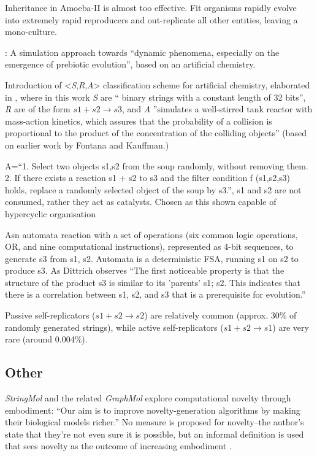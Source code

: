 Inheritance in Amoeba-II is almost too effective. Fit organisms rapidly evolve into extremely rapid reproducers and out-replicate all other entities, leaving a mono-culture.

\begin{NOTES}
\cite{Dittrich1998}:
A simulation approach towards ``dynamic phenomena, especially on the emergence of prebiotic evolution'', based on an artificial chemistry.

Introduction of \textless{}\emph{S},\emph{R},\emph{A}\textgreater{} classification scheme for artificial chemistry, elaborated in \parencite{Dittrich:2001zr}, where in this work \emph{S} are `` binary strings with a constant length of 32 bits'', \emph{R} are of the form $s1+s2 \rightarrow s3$, and \emph{A} ''simulates a well-stirred tank reactor with mass-action kinetics, which assures that the probability of a collision is proportional to the product of the concentration of the colliding objects'' (based on earlier work by Fontana and Kauffman.)

A=``1. Select two objects s1,s2 from the soup randomly, without removing them. 2. If there exists a reaction s1 + s2 to s3 and the filter condition f (s1,s2,s3) holds, replace a randomly selected object of the soup by s3.'', s1 and s2 are not consumed, rather they act as catalysts. Chosen as this shown capable of hypercyclic organisation

Asn automata reaction with a set of operations (six common logic operations, \eg OR, and nine computational instructions), represented as 4-bit sequences, to generate s3 from s1, s2. Automata is a deterministic FSA, running s1 on s2 to produce s3. As Dittrich observes ``The first noticeable property is that the structure of the product s3 is similar to its 'parents' s1; s2. This indicates that there is a correlation between s1, s2, and s3 that is a prerequisite for evolution.''

Passive self-replicators ($s1 + s2 \rightarrow s2$) are relatively common (approx. 30\% of randomly generated strings), while active self-replicators ($s1 + s2 \rightarrow s1$) are very rare (around 0.004\%).
\end{NOTES}
\subsection{Other}

\emph{StringMol} \parencite{Hickinbotham2011} and the related \emph{GraphMol} \parencite{Nellis2012, Nellis2014} explore computational novelty through embodiment: ``Our aim is to improve novelty-generation algorithms by making their biological models richer.'' No measure is proposed for novelty--the author's state that they're not even sure it is possible, but an informal definition is used that sees novelty as the outcome of increasing embodiment \parencite[p.87]{Nellis2012}. 

